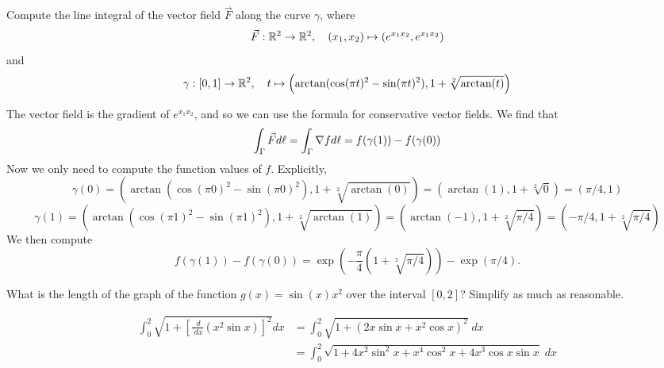 \documentclass[11pt]{article}
\begin{document}
\begin{exercise}
    Compute the line integral of the vector field $\vec{F}$ along the curve $\gamma$, where 
    \[
        \vec F : \mathbb{R}^2 \to \mathbb{R}^2, \quad (x_1,x_2) \mapsto ( e^{ x_1x_2 }, e^{ x_1 x_2 } )
    \]
    and 
    \[
        \gamma : [0,1] \to \mathbb{R}^2, \quad t \mapsto \left( \arctan( \cos(\pi t)^2 - \sin(\pi t)^2 ), 1 + \sqrt[2]{\arctan(t)} \right)
    \]
\end{exercise}
\begin{solution}
    The vector field is the gradient of $e^{ x_1x_2 }$, and so we can use the formula for conservative vector fields.
    We find that
    \[
        \int_\Gamma \vec F d\ell = \int_\Gamma \nabla f d\ell = f(\gamma(1)) - f(\gamma(0))
    \]
    Now we only need to compute the function values of $f$. Explicitly,
    \[
        \gamma(0) = \left( \arctan( \cos(\pi 0)^2 - \sin(\pi 0)^2 ), 1 + \sqrt[2]{\arctan(0)} \right) = \left( \arctan( 1 ), 1 + \sqrt[2]{0} \right) = \left( \pi/4, 1 \right)
    \]
    \[
        \gamma(1) = \left( \arctan( \cos(\pi 1)^2 - \sin(\pi 1)^2 ), 1 + \sqrt[2]{\arctan(1)} \right) = \left( \arctan( -1 ), 1 + \sqrt[2]{\pi/4} \right) = \left( -\pi/4, 1 + \sqrt[2]{\pi/4} \right)
    \]
    We then compute
    \[
        f(\gamma(1)) - f(\gamma(0)) = \exp\left( -\frac \pi 4 ( 1 + \sqrt[2]{\pi/4} ) \right) - \exp\left( \pi/4 \right).
    \]
\end{solution}

\begin{exercise}
    What is the length of the graph of the function $g(x) = \sin(x) x^2$ over the interval $[0,2]$?
    Simplify as much as reasonable.
\end{exercise}
\begin{solution}
\begin{align*}
	\int_0^2 \sqrt{1 + \left[\frac{\;d}{\;dx} (x^2\sin x)\right]^2}dx &= \int_0^2 \sqrt{1 + (2x\sin x + x^2\cos x)^2}\;dx\\
&=\int_0^2 \sqrt{1 + 4x^2\sin^2 x + x^4\cos^2 x + 4x^3\cos x\sin x}\;dx
\end{align*}
\end{solution}
\end{document}

